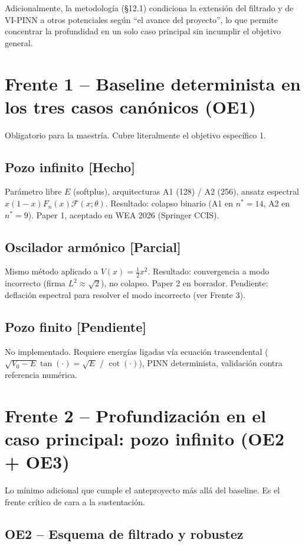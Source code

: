 \documentclass[11pt]{article}
\newcommand{\done}{\textcolor{green!50!black}{\textbf{[Hecho]}}}
\newcommand{\pdone}{\textcolor{orange!80!black}{\textbf{[Parcial]}}}
\newcommand{\pending}{\textcolor{red!70!black}{\textbf{[Pendiente]}}}
\begin{document}
Adicionalmente, la metodología (\S12.1) condiciona la extensión del filtrado y de
VI-PINN a otros potenciales según ``el avance del proyecto'', lo que permite
concentrar la profundidad en un solo caso principal sin incumplir el objetivo
general.

\section{Frente 1 -- Baseline determinista en los tres casos canónicos (OE1)}

Obligatorio para la maestría. Cubre literalmente el objetivo específico 1.

\subsection{Pozo infinito \done}
Parámetro libre $E$ (softplus), arquitecturas A1 (128) / A2 (256), ansatz espectral
$x(1-x)F_n(x)\mathcal{F}(x;\theta)$. Resultado: colapso binario (A1 en $n^*=14$, A2 en
$n^*=9$). Paper 1, aceptado en WEA 2026 (Springer CCIS).

\subsection{Oscilador armónico \pdone}
Mismo método aplicado a $V(x)=\tfrac{1}{2}x^2$. Resultado: convergencia a modo
incorrecto (firma $L^2\approx\sqrt{2}$), no colapso. Paper 2 en borrador. Pendiente:
deflación espectral para resolver el modo incorrecto (ver Frente 3).

\subsection{Pozo finito \pending}
No implementado. Requiere energías ligadas vía ecuación trascendental
($\sqrt{V_0-E}\tan(\cdot) = \sqrt{E}$ / $\cot(\cdot)$), PINN determinista, validación
contra referencia numérica.

\section{Frente 2 -- Profundización en el caso principal: pozo infinito (OE2 + OE3)}

Lo mínimo adicional que cumple el anteproyecto más allá del baseline. Es el frente
crítico de cara a la sustentación.

\subsection{OE2 -- Esquema de filtrado y robustez}
\end{document}
